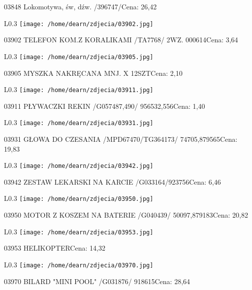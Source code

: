 03848 Lokomotywa, św, dźw. /396747/Cena: 26,42\newline
\begin{wrapfigure}{L}{0.3\textwidth}
\texttt{[image: /home/dearn/zdjecia/03902.jpg]}
\end{wrapfigure}
03902 TELEFON KOM.Z KORALIKAMI /TA7768/  2WZ.         000614Cena: 3,64\newline
\begin{wrapfigure}{L}{0.3\textwidth}
\texttt{[image: /home/dearn/zdjecia/03905.jpg]}
\end{wrapfigure}
03905 MYSZKA NAKRĘCANA MNJ. X 12SZTCena: 2,10\newline
\begin{wrapfigure}{L}{0.3\textwidth}
\texttt{[image: /home/dearn/zdjecia/03911.jpg]}
\end{wrapfigure}
03911 PŁYWACZKI REKIN  /G057487,490/              956532,556Cena: 1,40\newline
\begin{wrapfigure}{L}{0.3\textwidth}
\texttt{[image: /home/dearn/zdjecia/03931.jpg]}
\end{wrapfigure}
03931 GŁOWA DO CZESANIA /MPD67470/TG364173/     74705,879565Cena: 19,83\newline
\begin{wrapfigure}{L}{0.3\textwidth}
\texttt{[image: /home/dearn/zdjecia/03942.jpg]}
\end{wrapfigure}
03942 ZESTAW LEKARSKI NA KARCIE /G033164/923756Cena: 6,46\newline
\begin{wrapfigure}{L}{0.3\textwidth}
\texttt{[image: /home/dearn/zdjecia/03950.jpg]}
\end{wrapfigure}
03950 MOTOR Z KOSZEM NA BATERIE  /G040439/      50097,879183Cena: 20,82\newline
\begin{wrapfigure}{L}{0.3\textwidth}
\texttt{[image: /home/dearn/zdjecia/03953.jpg]}
\end{wrapfigure}
03953 HELIKOPTERCena: 14,32\newline
\begin{wrapfigure}{L}{0.3\textwidth}
\texttt{[image: /home/dearn/zdjecia/03970.jpg]}
\end{wrapfigure}
03970 BILARD "MINI POOL"   /G031876/                  918615Cena: 28,64\newline
